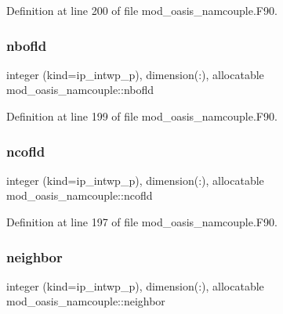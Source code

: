 Definition at line 200 of file mod\+\_\+oasis\+\_\+namcouple.\+F90.

\mbox{\label{namespacemod__oasis__namcouple_a21400200658d24cbf7484b5eb177c911}} 
\subsubsection{\texorpdfstring{nbofld}{nbofld}}
{\footnotesize\ttfamily integer (kind=ip\+\_\+intwp\+\_\+p), dimension(\+:), allocatable mod\+\_\+oasis\+\_\+namcouple\+::nbofld\hspace{0.3cm}{\ttfamily [private]}}



Definition at line 199 of file mod\+\_\+oasis\+\_\+namcouple.\+F90.

\mbox{\label{namespacemod__oasis__namcouple_a9f8a2a4f44b1c56860fef8df014339d3}} 
\subsubsection{\texorpdfstring{ncofld}{ncofld}}
{\footnotesize\ttfamily integer (kind=ip\+\_\+intwp\+\_\+p), dimension(\+:), allocatable mod\+\_\+oasis\+\_\+namcouple\+::ncofld\hspace{0.3cm}{\ttfamily [private]}}



Definition at line 197 of file mod\+\_\+oasis\+\_\+namcouple.\+F90.

\mbox{\label{namespacemod__oasis__namcouple_a298c9165785ae1a41f89597cadd211e7}} 
\subsubsection{\texorpdfstring{neighbor}{neighbor}}
{\footnotesize\ttfamily integer (kind=ip\+\_\+intwp\+\_\+p), dimension(\+:), allocatable mod\+\_\+oasis\+\_\+namcouple\+::neighbor\hspace{0.3cm}{\ttfamily [private]}}



